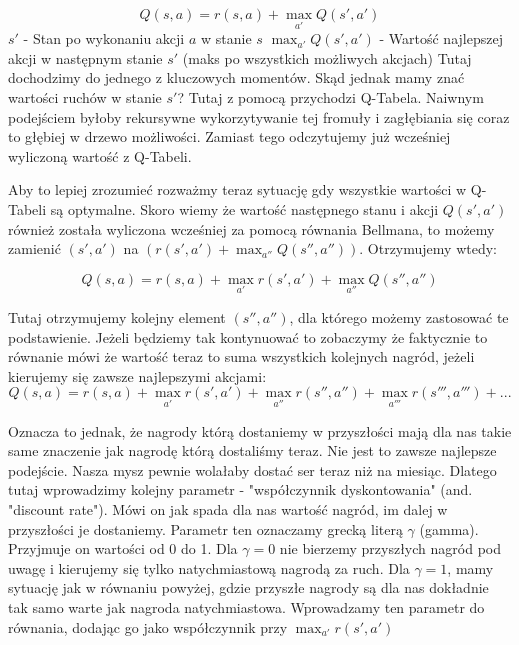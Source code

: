 \documentclass[a4paper,12pt]{article}
\begin{document}
\[ Q(s, a) =  r(s, a) + \max_{a'}Q(s', a')\]
\(s'\) - Stan po wykonaniu akcji \(a\) w stanie \(s\) \newline
\(\max_{a'}Q(s', a')\) - Wartość najlepszej akcji w następnym stanie \(s'\) (maks po wszystkich możliwych akcjach)
\newline \newline Tutaj dochodzimy do jednego z kluczowych momentów. Skąd jednak mamy znać wartości ruchów w stanie \(s'\)? Tutaj z pomocą przychodzi Q-Tabela. Naiwnym podejściem byłoby rekursywne wykorzytywanie tej fromuły i zagłębiania się coraz to głębiej w drzewo możliwości. Zamiast tego odczytujemy już wcześniej wyliczoną wartość z Q-Tabeli. 
 
Aby to lepiej zrozumieć rozważmy teraz sytuację gdy wszystkie wartości w Q-Tabeli są optymalne. Skoro wiemy że wartość następnego stanu i akcji \(Q(s', a')\) również została wyliczona wcześniej za pomocą równania Bellmana, to możemy zamienić \((s', a')\) na \((r(s', a') + \max_{a''}Q(s'', a''))\). Otrzymujemy wtedy:

\[ Q(s, a) =  r(s, a) + \max_{a'}r(s', a') + \max_{a''}Q(s'', a'')\]

Tutaj otrzymujemy kolejny element \((s'', a'')\), dla którego możemy zastosować te podstawienie. Jeżeli będziemy tak kontynuować to zobaczymy że faktycznie to równanie mówi że wartość teraz to suma wszystkich kolejnych nagród, jeżeli kierujemy się zawsze najlepszymi akcjami: 
\[ Q(s, a) =  r(s, a) + \max_{a'}r(s', a') + \max_{a''}r(s'', a'') + \max_{a'''}r(s''', a''') + ...\]

Oznacza to jednak, że nagrody którą dostaniemy w przyszłości mają dla nas takie same znaczenie jak nagrodę którą dostaliśmy teraz. Nie jest to zawsze najlepsze podejście. Nasza mysz pewnie wolałaby dostać ser teraz niż na miesiąc. Dlatego tutaj wprowadzimy kolejny parametr - "współczynnik dyskontowania" (and. "discount rate"). Mówi on jak spada dla nas wartość nagród, im dalej w przyszłości je dostaniemy. Parametr ten oznaczamy grecką literą $\gamma$ (gamma). Przyjmuje on wartości od 0 do 1. Dla $\gamma = 0$ nie bierzemy przyszłych nagród pod uwagę i kierujemy się tylko natychmiastową nagrodą za ruch. Dla $\gamma = 1$, mamy sytuację jak w równaniu powyżej, gdzie przyszłe nagrody są dla nas dokładnie tak samo warte jak nagroda natychmiastowa. Wprowadzamy ten parametr do równania, dodając go jako współczynnik przy \(\max_{a'}r(s', a')\)
\end{document}
